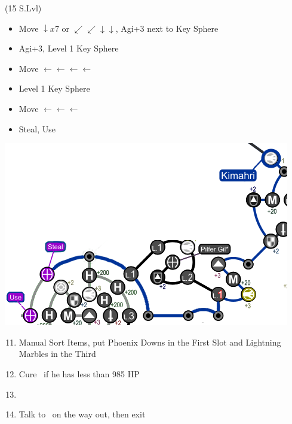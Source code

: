 \begin{spheregrid}
\begin{multicols}{2}
\begin{itemize}
			\kimahrif (15 S.Lvl)
			\begin{itemize}
				\item Move $\downarrow x7$ or $\swarrow\swarrow\downarrow\downarrow$, Agi+3 next to Key Sphere
				\item Agi+3, Level 1 Key Sphere
				\item Move $\leftarrow\leftarrow\leftarrow\leftarrow$
				\item Level 1 Key Sphere
				\item Move $\leftarrow\leftarrow\leftarrow$
				\item Steal, Use
			\end{itemize}
			\includegraphics[width=.8\columnwidth]{graphics/Kimahri_post_spheremorph}
		\end{itemize}
	\end{multicols}
\end{spheregrid}
\colstart
\begin{enumerate}
	\setcounter{enumi}{10}
	\item Manual Sort Items, put Phoenix Downs in the First Slot and Lightning Marbles in the Third
	\item Cure \kimahri\ if he has less than 985 HP
	\item \formation{\tidus}{\lulu}{\kimahri}
	\item Talk to \auron\ on the way out, then exit
\end{enumerate}
\newpage
